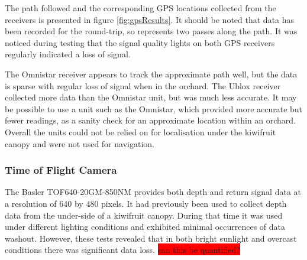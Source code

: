 \documentclass[preprint,authoryear,12pt]{elsarticle}
\begin{document}
        The path followed and the corresponding GPS locations collected from the receivers is presented in figure \ref{fig:gpsResults}.
        It should be noted that data has been recorded for the round-trip, so represents two passes along the path.
        It was noticed during testing that the signal quality lights on both GPS receivers regularly indicated a loss of signal.


        The Omnistar receiver appears to track the approximate path well, but the data is sparse with regular loss of signal when in the orchard.
    	The Ublox receiver collected more data than the Omnistar unit, but was much less accurate.
        It may be possible to use a unit such as the Omnistar, which provided more accurate but fewer readings, as a sanity check for an approximate location within an orchard.
        Overall the units could not be relied on for localisation under the kiwifruit canopy and were not used for navigation.

    \subsubsection{Time of Flight Camera}

        The Basler TOF640-20GM-850NM provides both depth and return signal data at a resolution of 640 by 480 pixels.
        It had previously been used to collect depth data from the under-side of a kiwifruit canopy.
        During that time it was used under different lighting conditions and exhibited minimal occurrences of data washout.
        However, these tests revealed that in both bright sunlight and overcast conditions there was significant data loss. \colorbox{red}{can this be quantified?}




\end{document}
